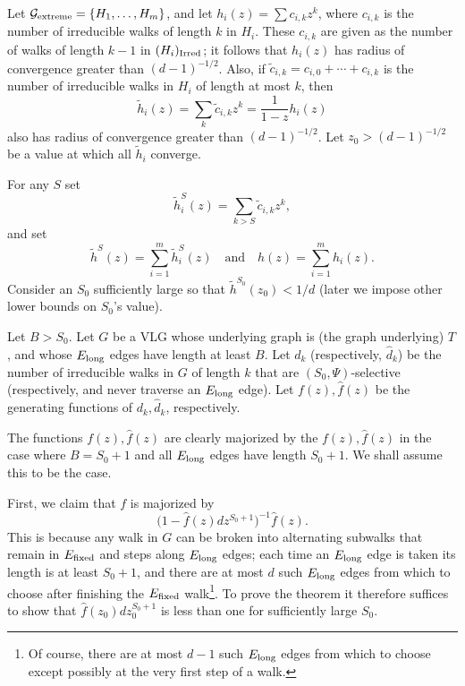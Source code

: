 \documentclass[12pt]{article}
\newcommand{\El}{{E_{\rm long}}}
\newcommand{\Ef}{{E_{\rm fixed}}}
\newcommand{\tset}{{\Psi}}
\newcommand{\ird}[1]{{\rm Irred}_{#1}}
\begin{document}
Let ${\cal G}_{\rm extreme}=\{H_1,\ldots,H_m\}$, and let
$h_i(z)=\sum c_{i,k} z^k$, where $c_{i,k}$ is the number
of irreducible walks of length $k$ in $H_i$.  These $c_{i,k}$ are
given as the number of walks of length $k-1$ in $(H_i)_{\ird{}}$; it follows
that $h_i(z)$ has radius of convergence greater than $(d-1)^{-1/2}$.  Also,
if $\widetilde c_{i,k}=c_{i,0}+\cdots+c_{i,k}$ is the number of irreducible
walks in $H_i$ of length at most $k$, then
$$
\widetilde h_i(z) = \sum_k \widetilde c_{i,k} z^k = \frac{1}{1-z}h_i(z)
$$
also has radius of convergence greater than $(d-1)^{-1/2}$.  Let
$z_0>(d-1)^{-1/2}$ be a value at which all $\widetilde h_i$ converge.

For any $S$ set
$$
\widetilde h_i^{S}(z) = \sum_{k>S} \widetilde c_{i,k} z^k,
$$
and set
$$
\widetilde h^{S}(z) = \sum_{i=1}^m \widetilde h_i^{S}(z) \quad\mbox{and}\quad
h(z) = \sum_{i=1}^m h_i(z).
$$
Consider an
$S_0$ sufficiently large so that
$\widetilde h^{S_0}(z_0)< 1/d$ (later we impose other lower bounds on
$S_0$'s value).

Let $B>S_0$.
Let $G$ be a VLG whose underlying graph is (the graph underlying) $T$, and
whose $\El$ edges have length at least $B$.  Let $d_k$ (respectively,
$\widehat d_k$) be the number of irreducible walks in $G$ of length $k$
that are $(S_0,\tset)$-selective (respectively, and never traverse an
$\El$ edge).  Let $f(z),\widehat f(z)$ be the generating functions
of $d_k,\widehat d_k$, respectively.

The functions $f(z),\widehat f(z)$ are clearly majorized by the
$f(z),\widehat f(z)$ in the case where $B=S_0+1$ and all $\El$ edges
have length $S_0+1$.  We shall assume this to be the case.

First, we claim that $f$ is majorized by
$$
\bigl(1 - \widehat f(z) dz^{S_0+1}\bigr)^{-1} \widehat f(z).
$$
This is because any walk in $G$ can be broken into alternating
subwalks that remain in
$\Ef$ and steps along $\El$ edges; each time an $\El$ edge is taken
its length is at least $S_0+1$, and there are at most $d$ such
$\El$ edges from which
to choose after finishing the $\Ef$ walk\footnote{Of course,
there are at most $d-1$ such $\El$ edges from which to choose except
possibly at the very first step of a walk.}.
To prove the theorem it therefore suffices to show that 
$\widehat f(z_0) dz_0^{S_0+1}$ is less than one for sufficiently large $S_0$.
\end{document}
